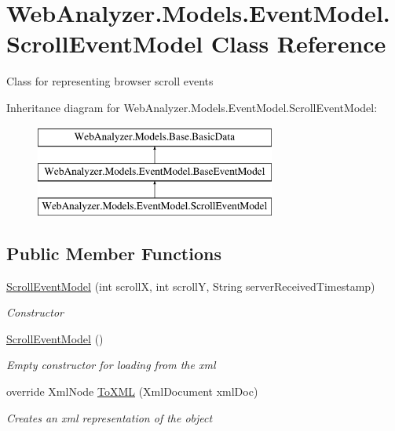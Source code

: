 \hypertarget{class_web_analyzer_1_1_models_1_1_event_model_1_1_scroll_event_model}{}\section{Web\+Analyzer.\+Models.\+Event\+Model.\+Scroll\+Event\+Model Class Reference}
\label{class_web_analyzer_1_1_models_1_1_event_model_1_1_scroll_event_model}


Class for representing browser scroll events  


Inheritance diagram for Web\+Analyzer.\+Models.\+Event\+Model.\+Scroll\+Event\+Model\+:\begin{figure}[H]
\begin{center}
\leavevmode
\includegraphics[height=3.000000cm]{class_web_analyzer_1_1_models_1_1_event_model_1_1_scroll_event_model}
\end{center}
\end{figure}
\subsection*{Public Member Functions}
\begin{DoxyCompactItemize}
\item 
\hyperlink{class_web_analyzer_1_1_models_1_1_event_model_1_1_scroll_event_model_a3838b54daf2a7553722fb03bca9b69dc}{Scroll\+Event\+Model} (int scroll\+X, int scroll\+Y, String server\+Received\+Timestamp)
\begin{DoxyCompactList}\small\item\em Constructor \end{DoxyCompactList}\item 
\hyperlink{class_web_analyzer_1_1_models_1_1_event_model_1_1_scroll_event_model_af4f8c38ef631eca3764a8c9a64d3ed0b}{Scroll\+Event\+Model} ()
\begin{DoxyCompactList}\small\item\em Empty constructor for loading from the xml \end{DoxyCompactList}\item 
override Xml\+Node \hyperlink{class_web_analyzer_1_1_models_1_1_event_model_1_1_scroll_event_model_a31a31878863b84ba68338278f0624c9f}{To\+X\+M\+L} (Xml\+Document xml\+Doc)
\begin{DoxyCompactList}\small\item\em Creates an xml representation of the object \end{DoxyCompactList}\end{DoxyCompactItemize}
